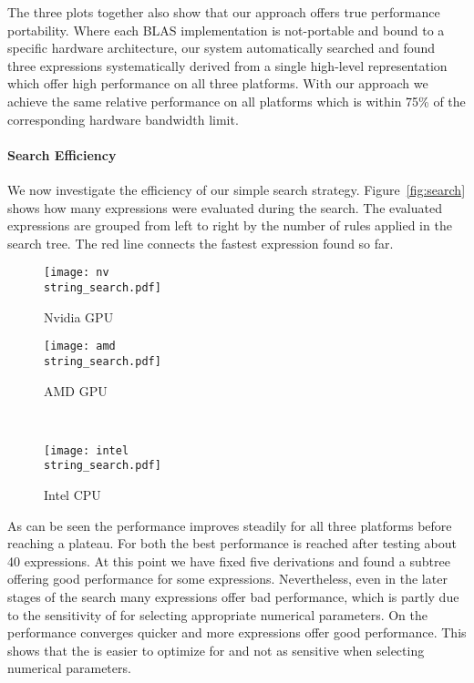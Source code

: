 The three plots together also show that our approach offers true performance portability.
Where each BLAS implementation is not-portable and bound to a specific hardware architecture, our system automatically searched and found three expressions systematically derived from a single high-level representation which offer high performance on all three platforms.
With our approach we achieve the same relative performance on all platforms which is within 75\% of the corresponding hardware bandwidth limit.


\paragraph{Search Efficiency}
We now investigate the efficiency of our simple search strategy.
Figure~\ref{fig:search} shows how many expressions were evaluated during the search.
The evaluated expressions are grouped from left to right by the number of rules applied in the search tree.
The red line connects the fastest expression found so far.

\begin{figure*}[t]
%
\begin{subfigure}[b]{0.48\linewidth}
\texttt{[image: nv\\string\_search.pdf]}
\caption{Nvidia GPU}
\label{fig:search:nv}
\end{subfigure}
\hfill
%
\begin{subfigure}[b]{0.48\linewidth}
\texttt{[image: amd\\string\_search.pdf]}
\caption{AMD GPU}
\label{fig:search:amd}
\end{subfigure}
\\
\centering
%
\begin{subfigure}[b]{0.48\linewidth}
\texttt{[image: intel\\string\_search.pdf]}
\caption{Intel CPU}
\label{fig:search:intel}
\end{subfigure}

\caption{
   Search efficiency.
   The vertical partitioning represents the number of fixed derivations in the search tree.
   The red line connects the fastest expressions found so far.
}
\label{fig:search}
\end{figure*}

As can be seen the performance improves steadily for all three platforms before reaching a plateau.
For both \GPUs the best performance is reached after testing about 40 expressions.
At this point we have fixed five derivations and found a subtree offering good performance for some expressions.
Nevertheless, even in the later stages of the search many expressions offer bad performance, which is partly due to the sensitivity of \GPU for selecting appropriate numerical parameters.
On the \CPU performance converges quicker and more expressions offer good performance.
This shows that the \CPU is easier to optimize for and not as sensitive when selecting numerical parameters.

